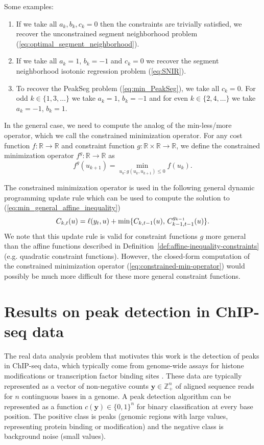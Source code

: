 \documentclass{article}
\newcommand{\ZZ}{\mathbb Z}
\newcommand{\RR}{\mathbb R}
\begin{document}
Some examples:
\begin{enumerate}
\item If we take all $a_k,b_k,c_k=0$ then the constraints are
  trivially satisfied, we
  recover the unconstrained segment neighborhood problem
  (\ref{eq:optimal_segment_neighborhood}).
\item If we take all $a_{k} =1$, $b_{k}=-1$ and $c_{k} = 0$ we
  recover the segment neighborhood isotonic regression problem (\ref{eq:SNIR}).
\item To recover the PeakSeg problem (\ref{eq:min_PeakSeg}),
  we take all $c_{k} = 0$. For odd $k\in\{1,3,\dots\}$ we take
  $a_{k} =1$, $b_{k}=-1$ and for even $k\in\{2,4,\dots\}$ we take
  $a_{k} =-1$, $b_{k}=1$.
\end{enumerate}

In the general case, we need to compute the analog of the
min-less/more operator, which we call the constrained minimization
operator. For any cost function $f:\RR\rightarrow\RR$ and constraint
function $g:\RR\times\RR\rightarrow\RR$, we define the constrained
minimization operator $f^g:\RR\rightarrow\RR$ as
\begin{equation}
  \label{eq:constrained-min-operator}
  f^g(u_{k+1}) = \min_{u_k : g(u_k, u_{k+1})\leq 0} f(u_k).
\end{equation}

The constrained minimization operator is used in the following general
dynamic programming update rule which can be used to compute the
solution to (\ref{eq:min_general_affine_inequality})
\begin{equation}
  \label{eq:general_dp}
  C_{k,t}(u) = \ell(y_t,u) + \min\{
  C_{k,t-1}(u),\,
  C_{k-1,t-1}^{g_{k-1}}(u)
  \}.
\end{equation}
We note that this update rule is valid for constraint functions $g$
more general than the affine functions described in
Definition~\ref{def:affine-inequality-constraints} (e.g. quadratic
constraint functions). However, the closed-form computation of the
constrained minimization operator (\ref{eq:constrained-min-operator})
would possibly be much more difficult for these more general constraint functions. 

\section{Results on peak detection in ChIP-seq data}
\label{sec:results-chip-seq}
\label{sec:results}

The real data analysis problem that motivates this work is the
detection of peaks in ChIP-seq data, which typically come from
genome-wide assays for histone modifications or transcription factor
binding sites \citep{practical}. These data are typically represented
as a vector of non-negative counts $\mathbf y\in\ZZ_+^n$ of aligned
sequence reads for $n$ continguous bases in a genome. A peak detection
algorithm can be represented as a function $c(\mathbf y)\in\{0,1\}^n$
for binary classification at every base position. The positive class
is peaks (genomic regions with large values, representing protein
binding or modification) and the negative class is background noise
(small values).
\end{document}
